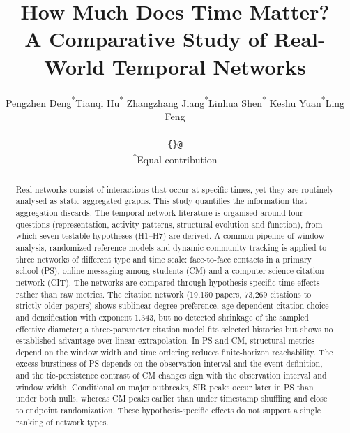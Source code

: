 \documentclass[10pt,twocolumn,letterpaper]{article}
\title{How Much Does Time Matter?\\
A Comparative Study of Real-World Temporal Networks}
\author{%
  Pengzhen Deng\textsuperscript{*}\quad Tianqi Hu\textsuperscript{*}\quad
  Zhangzhang Jiang\textsuperscript{*}\quad Linhua Shen\textsuperscript{*}\quad
  Keshu Yuan\textsuperscript{*}\quad Ling Feng\\
  \sharedaffiliation\\
  {\small\texttt{\{\emailids\}@\emaildomain}}\\
  {\small\textsuperscript{*}Equal contribution}
}
\begin{document}
\maketitle

\begin{abstract}
Real networks consist of interactions that occur at specific times, yet they are routinely
analysed as static aggregated graphs. This study quantifies the information that aggregation
discards. The
temporal-network literature is organised around four questions (representation, activity
patterns, structural evolution and function), from which seven testable hypotheses (H1--H7)
are derived. A common pipeline of window analysis, randomized reference models and
dynamic-community tracking is applied to three networks of different type and time scale:
face-to-face contacts in a primary school (PS), online messaging among students (CM) and a
computer-science citation network (CIT). The networks are compared through
hypothesis-specific time effects rather than raw metrics. The citation network (19,150 papers, 73,269
citations to strictly older papers) shows sublinear degree preference, age-dependent citation
choice and densification with exponent 1.343, but no detected shrinkage of the sampled
effective diameter; a three-parameter citation model fits selected histories but shows no
established advantage over linear extrapolation. In PS and CM, structural metrics depend on
the window width and time ordering reduces finite-horizon reachability. The excess
burstiness of PS depends on the observation interval and the event definition, and the
tie-persistence contrast of CM changes sign with the observation interval and window width.
Conditional on major outbreaks, SIR peaks occur later in PS than under both nulls, whereas CM
peaks earlier than under timestamp shuffling and close to endpoint randomization. These
hypothesis-specific effects do not support a single ranking of network types.
\end{abstract}









{\small


}
\end{document}

